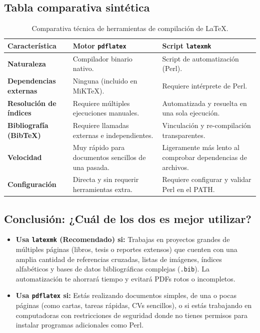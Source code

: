 \documentclass[
10pt, %
a4paper, %
oneside, %
headinclude,footinclude, %
BCOR5mm, %
]{scrartcl}
\begin{document}
\subsection{Tabla comparativa sintética}
\begin{table}[H]
	\centering
	\begin{tabular}{p{4.5cm} p{5.5cm} p{5.5cm}}
		\hline
		\textbf{Característica} & \textbf{Motor \texttt{pdflatex}} & \textbf{Script \texttt{latexmk}} \\
		\hline
		\textbf{Naturaleza} & Compilador binario nativo. & Script de automatización (Perl). \\
		\textbf{Dependencias externas} & Ninguna (incluido en MiKTeX). & Requiere intérprete de Perl. \\
		\textbf{Resolución de índices} & Requiere múltiples ejecuciones manuales. & Automatizada y resuelta en una sola ejecución. \\
		\textbf{Bibliografía (BibTeX)} & Requiere llamadas externas e independientes. & Vinculación y re-compilación transparentes. \\
		\textbf{Velocidad} & Muy rápido para documentos sencillos de una pasada. & Ligeramente más lento al comprobar dependencias de archivos. \\
		\textbf{Configuración} & Directa y sin requerir herramientas extra. & Requiere configurar y validar Perl en el PATH. \\
		\hline
	\end{tabular}
	\caption{Comparativa técnica de herramientas de compilación de LaTeX.}
	\label{tab:comparativa}
\end{table}

\subsection{Conclusión: ¿Cuál de los dos es mejor utilizar?}
\begin{itemize}
	\item \textbf{Usa \texttt{latexmk} (Recomendado) si:} Trabajas en proyectos grandes de múltiples páginas (libros, tesis o reportes extensos) que cuenten con una amplia cantidad de referencias cruzadas, listas de imágenes, índices alfabéticos y bases de datos bibliográficas complejas (\texttt{.bib}). La automatización te ahorrará tiempo y evitará PDFs rotos o incompletos.
	\item \textbf{Usa \texttt{pdflatex} si:} Estás realizando documentos simples, de una o pocas páginas (como cartas, tareas rápidas, CVs sencillos), o si estás trabajando en computadoras con restricciones de seguridad donde no tienes permisos para instalar programas adicionales como Perl.
\end{itemize}
\end{document}

